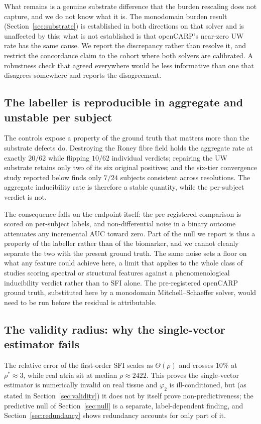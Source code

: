 \documentclass[11pt]{article}
\theoremstyle{definition}
\newcommand{\phii}{\varphi}
\newcommand{\rhoval}{\rho}
\begin{document}
What remains is a genuine substrate difference that the burden rescaling does not
capture, and we do not know what it is. The monodomain burden result
(Section~\ref{sec:substrate}) is established in both directions on that solver and
is unaffected by this; what is not established is that openCARP's near-zero UW rate
has the same cause. We report the discrepancy rather than resolve it, and restrict
the concordance claim to the cohort where both solvers are calibrated. A
robustness check that agreed everywhere would be less informative than one that
disagrees somewhere and reports the disagreement.

\subsection{The labeller is reproducible in aggregate and unstable per subject}
\label{sec:labelnoise}

The controls expose a property of the ground truth that matters more than the
substrate defects do. Destroying the Roney fibre field holds the aggregate rate
at exactly $20/62$ while flipping $10/62$ individual verdicts; repairing the UW
substrate retains only two of its six original positives; and the six-tier
convergence study reported below finds only $7/24$ subjects consistent across
resolutions. The aggregate inducibility rate is therefore a stable quantity,
while the per-subject verdict is not.

The consequence falls on the endpoint itself: the pre-registered comparison is
scored on per-subject labels, and non-differential noise in a binary outcome
attenuates any incremental AUC toward zero. Part of the null we report is thus a
property of the labeller rather than of the biomarker, and we cannot cleanly
separate the two with the present ground truth. The same noise sets a floor on
what any feature could achieve here, a limit that applies to the whole class of
studies scoring spectral or structural features against a phenomenological
inducibility verdict rather than to SFI alone. The pre-registered openCARP
ground truth, substituted here by a monodomain Mitchell--Schaeffer solver,
would need to be run before the residual is attributable.

\subsection{The validity radius: why the single-vector estimator fails}
The relative error of the first-order SFI scales as $\Theta(\rhoval)$ and crosses
$10\%$ at $\rhoval^\ast\approx3$, while real atria sit at median
$\rhoval\approx2422$. This proves the single-vector estimator is numerically
invalid on real tissue and $\phii_2$ is ill-conditioned, but (as stated in
Section~\ref{sec:validity}) it does not by itself prove non-predictiveness; the
predictive null of Section~\ref{sec:null} is a separate, label-dependent
finding, and Section~\ref{sec:redundancy} shows redundancy accounts for only
part of it.
\end{document}
